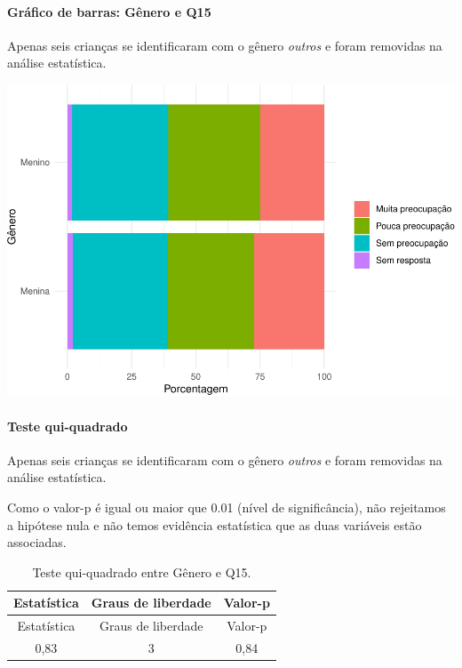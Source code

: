 \documentclass[]{article}
\let\oldparagraph\paragraph
\renewcommand{\paragraph}[1]{\oldparagraph{#1}\mbox{}}
\begin{document}
\hypertarget{gruxe1fico-de-barras-guxeanero-e-q15}{%
\paragraph{Gráfico de barras: Gênero e Q15}\label{gruxe1fico-de-barras-guxeanero-e-q15}}

Apenas seis crianças se identificaram com o gênero \emph{outros} e foram removidas na análise estatística.

\begin{center}\includegraphics[width=0.75\linewidth]{relatorio_covid19_files/figure-latex/unnamed-chunk-83-1} \end{center}

\hypertarget{teste-qui-quadrado-8}{%
\paragraph{Teste qui-quadrado}\label{teste-qui-quadrado-8}}

Apenas seis crianças se identificaram com o gênero \emph{outros} e foram removidas na análise estatística.

Como o valor-p é igual ou maior que 0.01 (nível de significância), não rejeitamos a hipótese nula e não temos evidência estatística que as duas variáveis estão associadas.

\begin{longtable}[]{@{}ccc@{}}
\caption{\label{tab:unnamed-chunk-85}Teste qui-quadrado entre Gênero e Q15.}\tabularnewline
\toprule
Estatística & Graus de liberdade & Valor-p\tabularnewline
\midrule
\endfirsthead
\toprule
Estatística & Graus de liberdade & Valor-p\tabularnewline
\midrule
\endhead
0,83 & 3 & 0,84\tabularnewline
\bottomrule
\end{longtable}

\cleardoublepage
\end{document}
